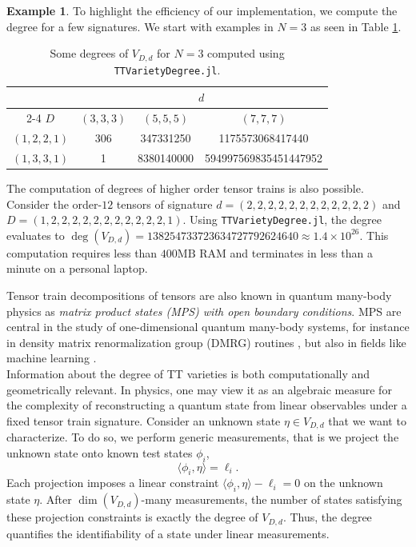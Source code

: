 \documentclass{article}
\theoremstyle{definition}
\newtheorem{example}[theorem]{Example}
\begin{document}
\begin{example}
To highlight the efficiency of our implementation, we compute the degree for a few signatures. We start with examples in $N=3$ as seen in Table \ref{tab:degree_ex}.

\begin{table}[H]
\centering
\begin{tabular}{cccc}
\toprule
\multicolumn{1}{c}{} & \multicolumn{3}{c}{\textbf{$d$}} \\
\cmidrule(rl){2-4} 
\textbf{$D$} & \((3,3,3)\) & \((5,5,5)\) & \((7,7,7)\)  \\
\midrule
\((1,2,2,1)\) & 306 & 347331250 & 1175573068417440  \\
\((1,3,3,1)\) & 1 & 8380140000 & 594997569835451447952  \\
\bottomrule
\end{tabular}
\caption{Some degrees of $V_{D,d}$ for $N=3$ computed using \texttt{TTVarietyDegree.jl}.}
\label{tab:degree_ex}
\end{table}

\noindent
The computation of degrees of higher order tensor trains is also possible. Consider the order-$12$ tensors of signature $d = (2, 2, 2, 2, 2, 2, 2, 2, 2, 2, 2, 2)$ and $D = (1, 2, 2, 2, 2, 2, 2, 2, 2, 2, 2, 2, 1)$.
Using \texttt{TTVarietyDegree.jl}, the degree evaluates to $\deg(V_{D,d}) = 138254733723634727792624640 \approx 1.4\times 10^{26} $. This computation requires less than $400 \mathrm{MB}$ RAM  and terminates in less than a minute on a personal laptop.
\end{example}

Tensor train decompositions of tensors are also known in quantum many-body physics as \emph{matrix product states (MPS) with open boundary conditions}. MPS are central in the study of one-dimensional quantum many-body
systems, for instance in density matrix renormalization group (DMRG) routines \cite{White1992,Schollwoeck2011,Orus2014}, but also in fields like machine learning \cite{cheng_2019}.\\

Information about the degree of TT varieties is both computationally and
geometrically relevant. In physics, one may view it as an algebraic measure for the complexity
of reconstructing a quantum state from linear observables under a fixed
tensor train signature. Consider an unknown state $\eta \in V_{D, d}$ that we want to characterize. To do so, we perform generic measurements, that is we project the unknown state onto known test states $\phi_i$,
\begin{equation*}
    \langle \phi_i , \eta \rangle = \ell_i.
\end{equation*}
Each projection imposes a linear constraint $\langle \phi_i , \eta \rangle - \ell_i = 0$ on the unknown state $\eta$. After $\dim (V_{D, d})$-many measurements, the number of states satisfying these projection constraints is exactly the degree of $V_{D, d}$. Thus, the degree quantifies the identifiability of a state under linear measurements.  \\
\end{document}

